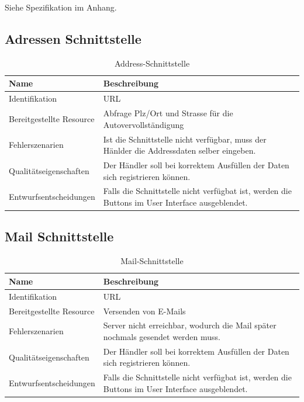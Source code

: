 Siehe Spezifikation im Anhang.

\subsection{Adressen Schnittstelle}

\begin{table}[H]
	\centering
	\caption{Address-Schnittstelle}
	\begin{tabular}{  | p{4cm} | p{11cm} |}
		\toprule
		{\textbf{Name}} & {\textbf{Beschreibung}} \\
		\midrule
		Identifikation & URL\\ \hline
		Bereitgestellte Resource & Abfrage Plz/Ort und Strasse für die Autovervollständigung \\ \hline
		Fehlerszenarien & Ist die Schnittstelle nicht verfügbar, muss der Hänlder die Addressdaten selber eingeben.\\ \hline
		Qualitätseigenschaften & Der Händler soll bei korrektem Ausfüllen der Daten sich registrieren können.\\ \hline
		Entwurfsentscheidungen & Falls die Schnittstelle nicht verfügbat ist, werden die Buttons im User Interface ausgeblendet.\\
		\bottomrule
	\end{tabular}
\end{table}

\subsection{Mail Schnittstelle}

\begin{table}[H]
	\centering
	\caption{Mail-Schnittstelle}
	\begin{tabular}{ | p{4cm} | p{11cm} |}
		\toprule
		{\textbf{Name}} & {\textbf{Beschreibung}} \\
		\midrule
		Identifikation & URL\\ \hline
		Bereitgestellte Resource & Versenden von E-Mails\\ \hline
		Fehlerszenarien & Server nicht erreichbar, wodurch die Mail später nochmals gesendet werden muss.\\ \hline
		Qualitätseigenschaften & Der Händler soll bei korrektem Ausfüllen der Daten sich registrieren können.\\ \hline
		Entwurfsentscheidungen & Falls die Schnittstelle nicht verfügbat ist, werden die Buttons im User Interface ausgeblendet.\\
		\bottomrule
	\end{tabular}
\end{table}

